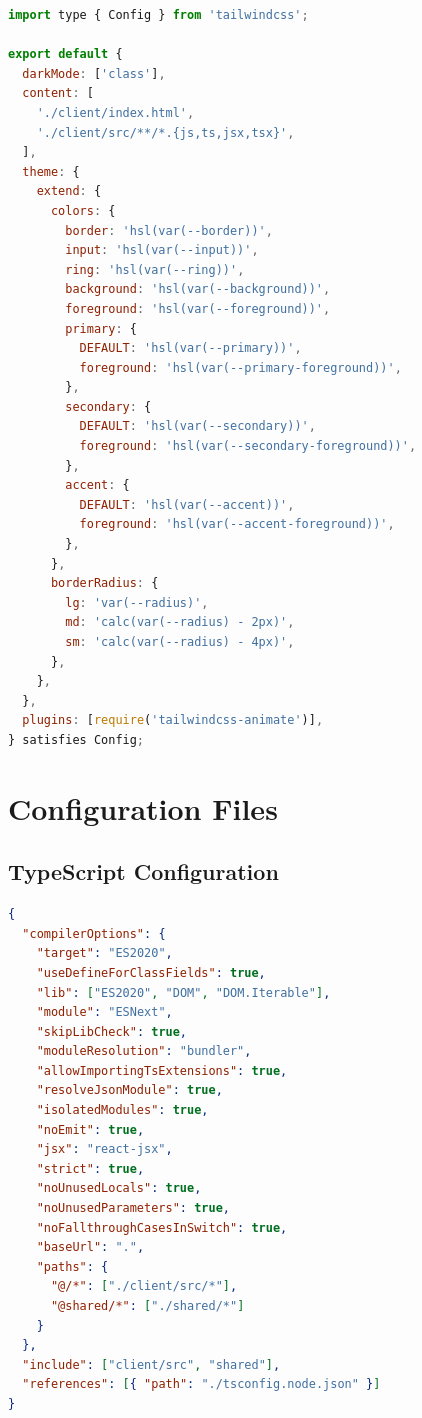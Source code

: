 \begin{lstlisting}[language=JavaScript, caption=tailwind.config.ts - Tailwind CSS configuration]
import type { Config } from 'tailwindcss';

export default {
  darkMode: ['class'],
  content: [
    './client/index.html',
    './client/src/**/*.{js,ts,jsx,tsx}',
  ],
  theme: {
    extend: {
      colors: {
        border: 'hsl(var(--border))',
        input: 'hsl(var(--input))',
        ring: 'hsl(var(--ring))',
        background: 'hsl(var(--background))',
        foreground: 'hsl(var(--foreground))',
        primary: {
          DEFAULT: 'hsl(var(--primary))',
          foreground: 'hsl(var(--primary-foreground))',
        },
        secondary: {
          DEFAULT: 'hsl(var(--secondary))',
          foreground: 'hsl(var(--secondary-foreground))',
        },
        accent: {
          DEFAULT: 'hsl(var(--accent))',
          foreground: 'hsl(var(--accent-foreground))',
        },
      },
      borderRadius: {
        lg: 'var(--radius)',
        md: 'calc(var(--radius) - 2px)',
        sm: 'calc(var(--radius) - 4px)',
      },
    },
  },
  plugins: [require('tailwindcss-animate')],
} satisfies Config;
\end{lstlisting}

\section{Configuration Files}

\subsection{TypeScript Configuration}

\begin{lstlisting}[language=JSON, caption=tsconfig.json - TypeScript compiler options]
{
  "compilerOptions": {
    "target": "ES2020",
    "useDefineForClassFields": true,
    "lib": ["ES2020", "DOM", "DOM.Iterable"],
    "module": "ESNext",
    "skipLibCheck": true,
    "moduleResolution": "bundler",
    "allowImportingTsExtensions": true,
    "resolveJsonModule": true,
    "isolatedModules": true,
    "noEmit": true,
    "jsx": "react-jsx",
    "strict": true,
    "noUnusedLocals": true,
    "noUnusedParameters": true,
    "noFallthroughCasesInSwitch": true,
    "baseUrl": ".",
    "paths": {
      "@/*": ["./client/src/*"],
      "@shared/*": ["./shared/*"]
    }
  },
  "include": ["client/src", "shared"],
  "references": [{ "path": "./tsconfig.node.json" }]
}
\end{lstlisting}

